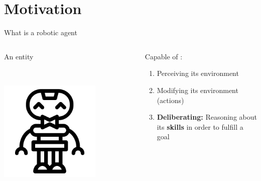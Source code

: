 \section{Motivation}
\begin{frame}{What is a robotic agent}

    \begin{columns}[T]
        \begin{column}{0.3\textwidth}
            An entity

            ~

            \includegraphics[width = 0.7\textwidth]{images/icons8-robot-gustav-500.png}
        \end{column}
        \begin{column}{0.7\textwidth}
            \center Capable of :
            \pause
            \begin{enumerate}
                \item Perceiving its environment
                \pause
                \item Modifying its environment (actions)
                \pause
                \item \textbf{Deliberating:} Reasoning about its \textbf{skills} in order to fulfill a goal
            \end{enumerate}
        \end{column}
    \end{columns}

 
\end{frame}


